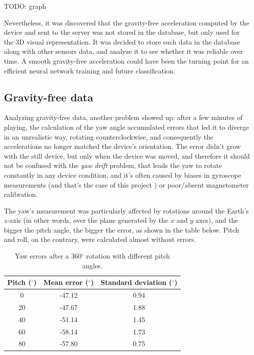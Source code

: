 TODO: graph
\bigbreak

Nevertheless, it was discovered that the gravity-free acceleration computed by the device and sent to the server was not stored in the database, but only used for the 3D visual representation. It was decided to store such data in the database along with other sensors data, and analyze it to see whether it was reliable over time. A smooth gravity-free acceleration could have been the turning point for an efficient neural network training and future classification.
\bigbreak

\subsection{Gravity-free data}
Analyzing gravity-free data, another problem showed up: after a few minutes of playing, the calculation of the yaw angle accumulated errors that led it to diverge in an unrealistic way, rotating counterclockwise, and consequently the accelerations no longer matched the device's orientation. The error didn't grow with the still device, but only when the device was moved, and therefore it should not be confused with the \textit{yaw drift} problem, that leads the yaw to rotate constantly in any device condition, and it's often caused by biases in gyroscope measurements (and that's the case of this project \cite{Pio19}) or poor/absent magnetometer calibration.
\bigbreak

The yaw's measurement was particularly affected by rotations around the Earth's $z$-axis (in other words, over the plane generated by the $x$ and $y$ axes), and the bigger the pitch angle, the bigger the error, as shown in the table below. Pitch and roll, on the contrary, were calculated almost without errors.
\bigbreak

\begin{table}[ht]
	\centering
	\begin{tabular}{c|c c}
	\textbf{Pitch} ($^{\circ}$) & \textbf{Mean error} ($^{\circ}$) & \textbf{Standard deviation} ($^{\circ}$) \\ \hline
	0                           & -47.12                           & 0.94                                     \\
	20                          & -47.67                           & 1.88                                     \\
	40                          & -51.14                           & 1.45                                     \\
	60                          & -58.14                           & 1.73                                     \\
	80                          & -57.80                           & 0.75
	\end{tabular}
	\caption{Yaw errors after a 360$^{\circ}$ rotation with different pitch angles.}
\end{table}

